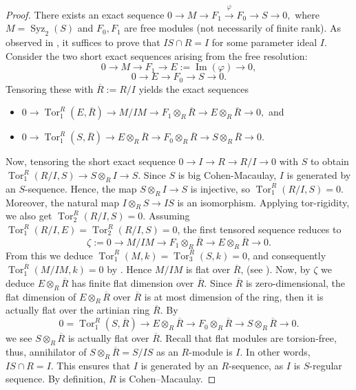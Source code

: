 \documentclass[11pt,a4paper]{amsart}
\numberwithin{equation}{section}
\theoremstyle{definition}
\theoremstyle{remark}
\newcommand{\Syz}{\operatorname{Syz}}
\begin{document}
\begin{proof}
 There exists an exact sequence
$
	0 \to M \to F_1 \xrightarrow{\varphi} F_0 \to  S \to 0,
$
	where \(M=\Syz_2(S)\) and \(F_0,F_1\) are free modules (not necessarily of finite rank). As observed in \cite[2.5]{sc1}, it suffices to prove that \(IS\cap R=I\) for some parameter ideal \(I\). 
Consider the two short exact sequences arising from the free resolution:
	\[
	0 \longrightarrow M \longrightarrow F_1 \longrightarrow E:=\operatorname{Im}(\varphi) \longrightarrow 0,
	\]
	\[
	0 \longrightarrow E \longrightarrow F_0 \longrightarrow S \longrightarrow 0.
	\]
	Tensoring these with \(\overline{R}:=R/I\) yields the exact sequences

\begin{itemize}
	\item[(i)]
 \(0 \longrightarrow \operatorname{Tor}_1^R(E,\overline{R}) \longrightarrow M/IM \longrightarrow F_1\otimes_R \overline{R} \longrightarrow E\otimes_R \overline{R} \longrightarrow 0,\) and
 \item[(ii)]	
	\(	0 \longrightarrow \operatorname{Tor}_1^R(S,\overline{R}) \longrightarrow E\otimes_R \overline{R} \longrightarrow F_0\otimes_R \overline{R} \longrightarrow S\otimes_R \overline{R} \longrightarrow 0.
	\) 
\end{itemize}

Now, tensoring the short exact sequence \(0\to I\to R\to R/I\to 0\) with \(S\) to obtain
$
	\operatorname{Tor}_1^R(R/I,S) \to S\otimes_R I \to S.
$
	Since \(S\) is big Cohen-Macaulay, $I$ is generated by an $S$-sequence. Hence, the map \(S\otimes_R I\to S\) is injective, so \(\operatorname{Tor}_1^R(R/I,S)=0\). Moreover, the natural map \(I\otimes_R S\to IS\) is an isomorphism. Applying tor-rigidity, we also get \(\operatorname{Tor}_2^R(R/I,S)=0\). Assuming \(\operatorname{Tor}_1^R(R/I,E)=\operatorname{Tor}_2^R(R/I,S)=0\), the first tensored sequence reduces to
	\[
\zeta:=	0\longrightarrow M/IM \longrightarrow F_1\otimes_R \overline{R} \longrightarrow E\otimes_R \overline{R} \longrightarrow 0.
	\]
	From this we deduce \(\operatorname{Tor}_1^R(M,k)=\operatorname{Tor}_3^R(S,k)=0\), and consequently \(\operatorname{Tor}_1^{\overline{R}}(M/IM,k)=0\) by \cite[2.1]{sc1}. Hence \(M/IM\) is flat over \(\overline{R}\), (see \cite[22.3]{mat}). Now, by $\zeta$	we deduce \(E\otimes_R \overline{R}\) has finite flat dimension over \(\overline{R}\).
	Since \(\overline{R}\) is zero-dimensional, the flat dimension of \(E\otimes_R \overline{R}\) over \(\overline{R}\) is at most dimension of the ring, then it is actually flat over the artinian ring \(\overline{R}\). 
By 		\[
0 = \operatorname{Tor}_1^R(S,\overline{R}) \longrightarrow E\otimes_R \overline{R} \longrightarrow F_0\otimes_R \overline{R} \longrightarrow S\otimes_R \overline{R} \longrightarrow 0.
\]
we see $S\otimes_R \overline{R}$
is actually flat over   \(\overline{R}\).  Recall that flat modules are torsion-free, thus, annihilator
of $S\otimes_R \overline{R}=S/IS$
as an $R$-module is $I$.
In other words, \(IS\cap R=I\). This ensures that \(I\) is generated by an \(R\)-sequence, as
\(I\) is $S$-regular sequence.
By definition, \(R\) is Cohen--Macaulay.
\end{proof}
\end{document}
